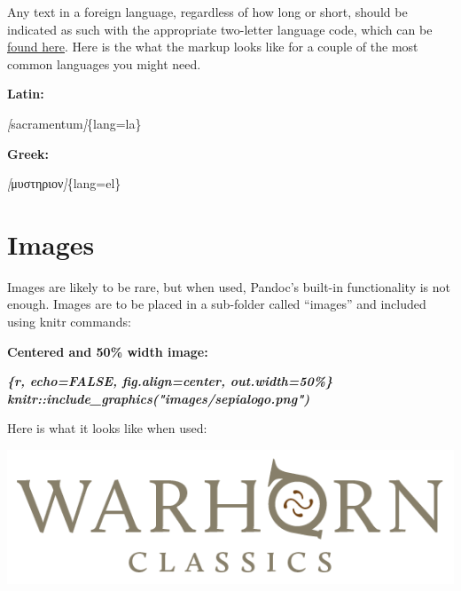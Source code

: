 \documentclass[
]{book}
\newenvironment{Shaded}{\begin{snugshade}}{\end{snugshade}}
\newcommand{\CommentTok}[1]{\textcolor[rgb]{0.56,0.35,0.01}{\textit{#1}}}
\newcommand{\InformationTok}[1]{\textcolor[rgb]{0.56,0.35,0.01}{\textbf{\textit{#1}}}}
\newcommand{\NormalTok}[1]{#1}
\newcommand{\OtherTok}[1]{\textcolor[rgb]{0.56,0.35,0.01}{#1}}
\begin{document}
Any text in a foreign language, regardless of how long or short, should be indicated as such with the appropriate two-letter language code, which can be \href{https://www.w3schools.com/tags/ref_language_codes.asp}{found here}. Here is the what the markup looks like for a couple of the most common languages you might need.

\textbf{Latin:}

\begin{Shaded}
\begin{Highlighting}[]
\CommentTok{[}\OtherTok{sacramentum}\CommentTok{]}\NormalTok{\{lang=la\}}
\end{Highlighting}
\end{Shaded}

\textbf{Greek:}

\begin{Shaded}
\begin{Highlighting}[]
\CommentTok{[}\OtherTok{μυστηριον}\CommentTok{]}\NormalTok{\{lang=el\}}
\end{Highlighting}
\end{Shaded}

\hypertarget{images}{%
\section{Images}\label{images}}

Images are likely to be rare, but when used, Pandoc's built-in functionality is not enough. Images are to be placed in a sub-folder called ``images'' and included using knitr commands:

\textbf{Centered and 50\% width image:}

\begin{Shaded}
\begin{Highlighting}[]
\InformationTok{\textasciigrave{}\textasciigrave{}\textasciigrave{}\{r, echo=FALSE, fig.align=\textquotesingle{}center\textquotesingle{}, out.width=\textquotesingle{}50\%\textquotesingle{}\}}
\InformationTok{knitr::include\_graphics("images/sepialogo.png")}
\InformationTok{\textasciigrave{}\textasciigrave{}\textasciigrave{}}
\end{Highlighting}
\end{Shaded}

Here is what it looks like when used:

\begin{center}\includegraphics[width=0.5\linewidth]{images/sepialogo} \end{center}
\end{document}
